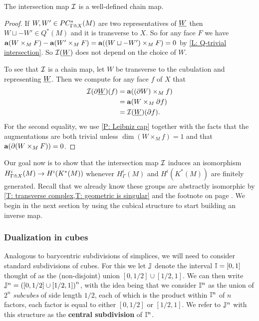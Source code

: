 \begin{proposition}
The intersection map $\mathcal{I}$ is a well-defined chain map.
\end{proposition}
\begin{proof}
If $W, W' \in PC^*_{\Gamma\pitchfork X}(M)$ are two representatives of $\underline{W}$ then $W\sqcup -W' \in Q^*(M)$ and it is transverse to $X$. So for any face $F$ we have $\mathbf{a}(W \times_M F)-\mathbf{a}(W' \times_M F) = \mathbf{a}((W\sqcup -W') \times_M F) = 0$ by \cref{L: Q-trivial intersection}. So $\mathcal{I}(\underline{W})$ does not depend on the choice of $W$.

To see that $\mathcal{I}$ is a chain map, let $W$ be transverse to the cubulation and representing $\underline{W}$. Then we compute for any face $f$ of $X$ that
\begin{align*}
\mathcal{I}(\partial\underline{W})(f)& = \mathbf{a}((\partial W) \times_M f)\\
& = \mathbf{a}(W \times_M \partial f)\\
& = \mathcal{I}(\underline{W})(\partial f).
\end{align*}
For the second equality, we use \cref{P: Leibniz cap} together with the facts that the augmentations are both trivial unless $\dim(W \times_M f) = 1$ and that $\mathbf{a}(\partial (W \times_M F)) = 0$.
\end{proof}



Our goal now is to show that the intersection map $\mathcal{I}$ induces an isomorphism $H^i_{\Gamma \pitchfork X}(M) \to H^i(K^*(M))$ whenever $H^i_\Gamma(M)$ and $H^i(K^*(M))$ are finitely generated. Recall that we already know these groups are abstractly isomorphic by \cref{T: transverse complex,T: geometric is singular} and the footnote on page \pageref{FN: cubical and singular}. We begin in the next section by using the cubical structure to start building an inverse map.



\subsubsection{Dualization in cubes}\label{S: dual cubes}







Analogous to barycentric subdivisions of simplices, we will need to consider standard subdivisions of cubes. For this we let $\mathbb{J}$ denote the interval $\mathbb{I} = [0,1]$ thought of as the (non-disjoint) union $[0,1/2] \cup [1/2,1]$. We can then write $\mathbb{J}^n = \left([0,1/2] \cup [1/2,1]\right)^n$, with the idea being that we consider $\mathbb{I}^n$ as the union of $2^n$ \textit{subcubes} of side length $1/2$, each of which is the product within $\mathbb{I}^n$ of $n$ factors, each factor is equal to either $[0,1/2]$ or $[1/2,1]$. We refer to $\mathbb{J}^n$ with this structure as the \textbf{central subdivision} of $\mathbb{I}^n$.

